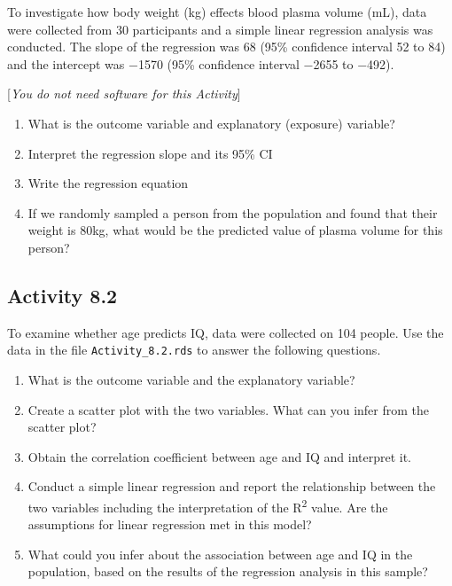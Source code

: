 \documentclass[
  a4paper,
]{memoir}
\providecommand{\tightlist}{%
  \setlength{\itemsep}{0pt}\setlength{\parskip}{0pt}}
\begin{document}
To investigate how body weight (kg) effects blood plasma volume (mL),
data were collected from 30 participants and a simple linear regression
analysis was conducted. The slope of the regression was 68 (95\%
confidence interval 52 to 84) and the intercept was −1570 (95\%
confidence interval −2655 to −492).

{[}\emph{You do not need software for this Activity}{]}

\begin{enumerate}
\def\labelenumi{\alph{enumi})}
\tightlist
\item
  What is the outcome variable and explanatory (exposure) variable?
\item
  Interpret the regression slope and its 95\% CI
\item
  Write the regression equation
\item
  If we randomly sampled a person from the population and found that
  their weight is 80kg, what would be the predicted value of plasma
  volume for this person?
\end{enumerate}

\subsection*{Activity 8.2}\label{activity-8.2}

To examine whether age predicts IQ, data were collected on 104 people.
Use the data in the file \texttt{Activity\_8.2.rds} to answer the
following questions.

\begin{enumerate}
\def\labelenumi{\alph{enumi})}
\tightlist
\item
  What is the outcome variable and the explanatory variable?
\item
  Create a scatter plot with the two variables. What can you infer from
  the scatter plot?
\item
  Obtain the correlation coefficient between age and IQ and interpret
  it.
\item
  Conduct a simple linear regression and report the relationship between
  the two variables including the interpretation of the
  R\textsuperscript{2} value. Are the assumptions for linear regression
  met in this model?
\item
  What could you infer about the association between age and IQ in the
  population, based on the results of the regression analysis in this
  sample?
\end{enumerate}
\end{document}

